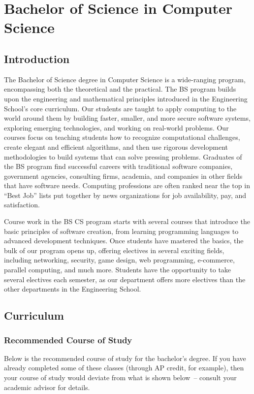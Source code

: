 \documentclass[10pt,letter]{book}
\newcommand{\mychapter}[2]{\chapter{#1}\renewcommand{\leftmark}{\textsc{#2}}}
\newcommand{\mysection}[1]{\section{#1}\renewcommand{\rightmark}{#1}}
\begin{document}
\clearpage
\mychapter{Bachelor of Science in Computer Science}{BS CS Degree}


\mysection{Introduction}


The Bachelor of Science degree in Computer Science is a wide-ranging
program, encompassing both the theoretical and the practical.  The BS
program builds upon the engineering and mathematical principles
introduced in the Engineering School's core curriculum.  Our students
are taught to apply computing to the world around them by building
faster, smaller, and more secure software systems, exploring emerging
technologies, and working on real-world problems.  Our courses focus
on teaching students how to recognize computational challenges, create
elegant and efficient algorithms, and then use rigorous development
methodologies to build systems that can solve pressing
problems. Graduates of the BS program find successful careers with
traditional software companies, government agencies, consulting firms,
academia, and companies in other fields that have software needs.
Computing professions are often ranked near the top in ``Best Job''
lists put together by news organizations for job availability, pay,
and satisfaction.

Course work in the BS CS program starts with several courses that
introduce the basic principles of software creation, from learning
programming languages to advanced development techniques.  Once
students have mastered the basics, the bulk of our program opens up,
offering electives in several exciting fields, including networking,
security, game design, web programming, e-commerce, parallel
computing, and much more.  Students have the opportunity to take
several electives each semester, as our department offers more
electives than the other departments in the Engineering School. 

\mysection{Curriculum}

\subsection{Recommended Course of Study}

Below is the recommended course of study for the bachelor's degree. If
you have already completed some of these classes (through AP credit,
for example), then your course of study would deviate from what is
shown below~-- consult your academic advisor for details.
\end{document}
